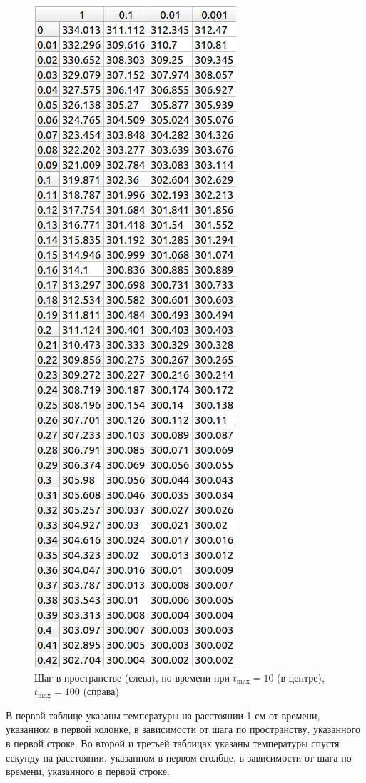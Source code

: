 \documentclass[a4paper,oneside,12pt]{extreport}
\begin{document}
\begin{enumerate}
\begin{figure}[H]
		\includegraphics[height=0.5\textheight]{inc/img/steptau100.png}
		\caption{Шаг в пространстве (слева), по времени при $t_{\max} = 10$ (в центре), $t_{\max} = 100$ (справа)}
		\label{img:step}
	\end{figure}

	В первой таблице указаны температуры на расстоянии 1 см от времени, указанном в первой колонке, в зависимости от шага по пространству, указанного в первой строке.
	Во второй и третьей таблицах указаны температуры спустя секунду на расстоянии, указанном в первом столбце, в зависимости от шага по времени, указанного в первой строке.


\end{enumerate}
\end{document}
